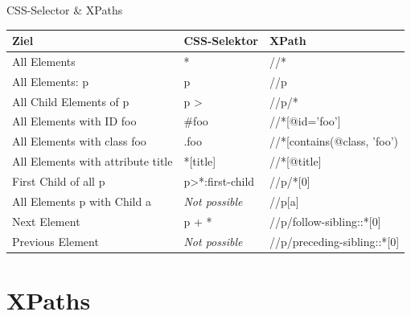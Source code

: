 \documentclass[xcolor=dvipsnames]{beamer}\usepackage[]{graphicx}\usepackage[]{color}
\begin{document}
\begin{frame}{CSS-Selector \& XPaths}
\footnotesize
\begin{table}[]
\begin{tabular}{lll}
\hline
Ziel                              & CSS-Selektor                 & XPath                           \\ \hline
All Elements                      & *                            & //*                             \\ \hline
All Elements: p                   & p                            & //p                             \\ \hline
All Child Elements of p           & p \textgreater *             & //p/*                           \\ \hline
All Elements with ID foo          & \#foo                        & //*{[}@id='foo'{]}              \\ \hline
All Elements with class foo       & .foo                         & //*{[}contains(@class, 'foo')   \\ \hline
All Elements with attribute title & *{[}title{]}                 & //*{[}@title{]}                 \\ \hline
First Child of all p              & p\textgreater{}*:first-child & //p/*{[}0{]}                    \\ \hline
All Elements p with Child a       & \textit{Not possible}        & //p{[}a{]}                      \\ \hline
Next Element                      & p + *                        & //p/follow-sibling::*{[}0{]}    \\ \cline{1-1} \cline{3-3} 
Previous Element                  & \textit{Not possible}        & //p/preceding-sibling::*{[}0{]} \\ \hline
\end{tabular}
\end{table}
\end{frame}



\section{XPaths}
\end{document}
